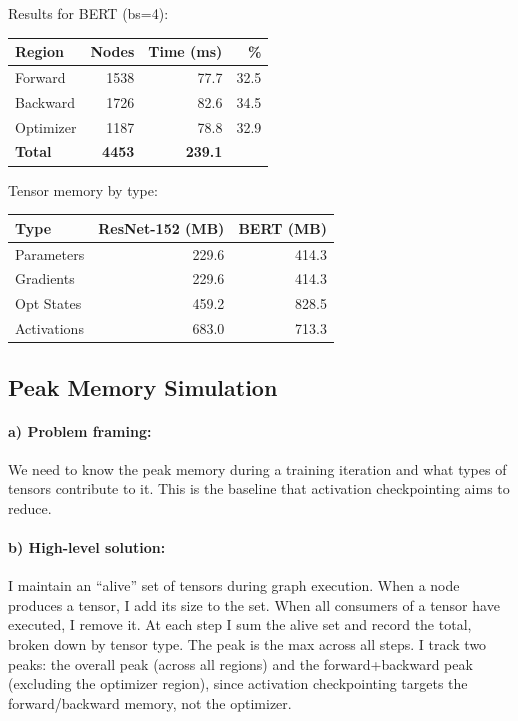 \documentclass[11pt]{article}
\begin{document}
Results for BERT (bs=4):

\begin{table}[h]
\centering
\begin{tabular}{lrrr}
\toprule
Region & Nodes & Time (ms) & \% \\
\midrule
Forward   & 1538 & 77.7 & 32.5 \\
Backward  & 1726 & 82.6 & 34.5 \\
Optimizer & 1187 & 78.8 & 32.9 \\
\midrule
\textbf{Total} & \textbf{4453} & \textbf{239.1} & \\
\bottomrule
\end{tabular}
\end{table}

Tensor memory by type:

\begin{table}[h]
\centering
\begin{tabular}{lrr}
\toprule
Type & ResNet-152 (MB) & BERT (MB) \\
\midrule
Parameters  & 229.6 & 414.3 \\
Gradients   & 229.6 & 414.3 \\
Opt States  & 459.2 & 828.5 \\
Activations & 683.0 & 713.3 \\
\bottomrule
\end{tabular}
\end{table}

\subsection{Peak Memory Simulation}

\paragraph{a) Problem framing:} We need to know the peak memory during a training iteration and what types of tensors contribute to it. This is the baseline that activation checkpointing aims to reduce.

\paragraph{b) High-level solution:} I maintain an ``alive'' set of tensors during graph execution. When a node produces a tensor, I add its size to the set. When all consumers of a tensor have executed, I remove it. At each step I sum the alive set and record the total, broken down by tensor type. The peak is the max across all steps. I track two peaks: the overall peak (across all regions) and the forward+backward peak (excluding the optimizer region), since activation checkpointing targets the forward/backward memory, not the optimizer.
\end{document}
